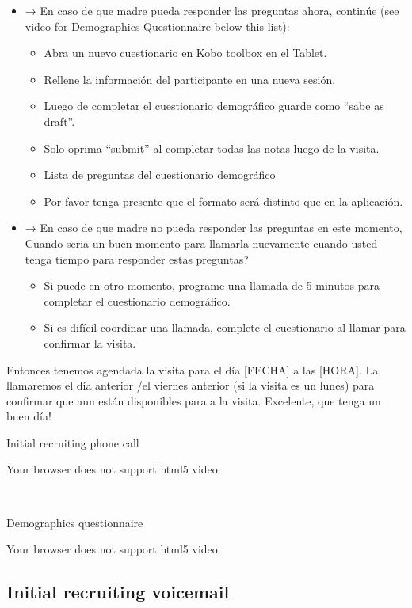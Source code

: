 \documentclass[
]{book}
\providecommand{\tightlist}{%
  \setlength{\itemsep}{0pt}\setlength{\parskip}{0pt}}
\begin{document}
\begin{itemize}
\tightlist
\item
  → En caso de que madre pueda responder las preguntas ahora, continúe (see video for Demographics Questionnaire below this list):

  \begin{itemize}
  \tightlist
  \item
    Abra un nuevo cuestionario en Kobo toolbox en el Tablet.
  \item
    Rellene la información del participante en una nueva sesión.
  \item
    Luego de completar el cuestionario demográfico guarde como ``sabe as draft''.
  \item
    Solo oprima ``submit'' al completar todas las notas luego de la visita.
  \item
    Lista de preguntas del cuestionario demográfico  
  \item
    Por favor tenga presente que el formato será distinto que en la aplicación.
  \end{itemize}
\item
  → En caso de que madre no pueda responder las preguntas en este momento, Cuando seria un buen momento para llamarla nuevamente cuando usted tenga tiempo para responder estas preguntas?

  \begin{itemize}
  \tightlist
  \item
    Si puede en otro momento, programe una llamada de 5-minutos para completar el cuestionario demográfico.
  \item
    Si es difícil coordinar una llamada, complete el cuestionario al llamar para confirmar la visita.
  \end{itemize}
\end{itemize}

Entonces tenemos agendada la visita para el día {[}FECHA{]} a las {[}HORA{]}. La llamaremos el día anterior /el viernes anterior (si la visita es un lunes) para confirmar que aun están disponibles para a la visita. Excelente, que tenga un buen día!

Initial recruiting phone call

Your browser does not support html5 video.

 

Demographics questionnaire

Your browser does not support html5 video.

\hypertarget{initial-recruiting-voicemail}{%
\subsection*{Initial recruiting voicemail}\label{initial-recruiting-voicemail}}
\end{document}

